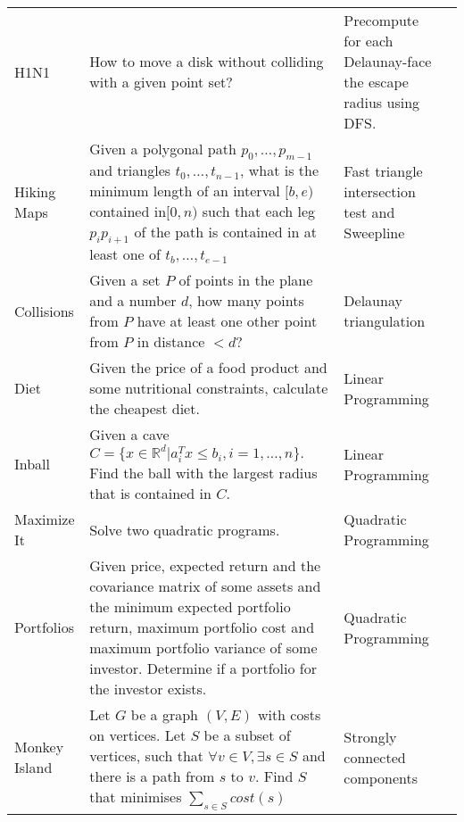 \documentclass[a4paper, 10pt]{article}
\begin{document}
\begin{longtable}{ L{2cm} L{8cm} L{4cm} r}
        H1N1
        & How to move a disk without colliding with a given point set?
        & Precompute for each Delaunay-face the escape radius using DFS. &  \pageref{sec:h1n1} \\

        Hiking Maps 
        & Given a polygonal path $p_0,\dots,p_{m-1}$ and triangles $t_0,\dots,t_{n-1}$, what is the minimum length of 
            an interval $[b,e)$contained in$[0,n)$ such that each leg $p_ip_{i+1}$ of the path is contained in at least one of
                    $t_b,\dots,t_{e-1}$
        & Fast triangle intersection test and Sweepline &  \pageref{sec:hiking_maps} \\

        Collisions 
        & Given a set $P$ of points in the plane and a number $d$, 
            how many points from $P$ have at least one other point from $P$ in distance $<d$?        
        & Delaunay triangulation &  \pageref{sec:collisions} \\

        Diet 
        & Given the price of a food product and some nutritional constraints, calculate the cheapest diet.
        & Linear Programming &  \pageref{sec:diet} \\

        Inball 
        & Given a cave $C=\{x\in \mathbb{R} ^d|a_i^Tx\leq b_i, i=1,\dots,n\}.$ Find the ball with the largest radius that is contained in $C$.
        & Linear Programming &  \pageref{sec:inball} \\

        Maximize It
        & Solve two quadratic programs. 
        & Quadratic Programming &  \pageref{sec:maximize_it} \\

        Portfolios 
        & Given price, expected return and the covariance matrix of some assets 
            and the minimum expected portfolio return, maximum portfolio cost  and maximum portfolio variance of some investor. 
            Determine if a portfolio for the investor exists.
        & Quadratic Programming &  \pageref{sec:portfolios} \\

        Monkey Island 
        & Let $G$ be a graph $(V,E)$ with costs on vertices. Let $S$ be a subset of vertices,
            such that $\forall v\in V,\exists s\in S$ and there is a path from  $s$ to $v$. 
            Find $S$ that minimises $\sum_{s\in S}cost(s)$ 
        & Strongly connected components &  \pageref{sec:monkey_island} \\


\end{longtable}
\end{document}
